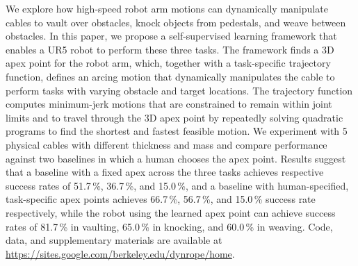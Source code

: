 We explore how high-speed robot arm motions can dynamically manipulate cables to vault over obstacles, knock objects from pedestals, and weave between obstacles. In this paper, we propose a self-supervised learning framework that enables a UR5 robot to perform these three tasks.
The framework finds a 3D apex point for the robot arm, which, together with a task-specific trajectory function, defines an arcing motion that dynamically manipulates the cable to perform tasks with varying obstacle and target locations. 
The trajectory function computes minimum-jerk motions that are constrained to remain within joint limits and to travel through the 3D apex point by repeatedly solving quadratic programs to find the shortest and fastest feasible motion.
We experiment with 5 physical cables with different thickness and mass and compare performance against two baselines in which a human chooses the apex point. Results suggest that a baseline with a fixed apex across the three tasks achieves respective success rates of 51.7\,\%, 36.7\,\%, and 15.0\,\%, and a baseline with human-specified, task-specific apex points achieves 66.7\,\%, 56.7\,\%, and 15.0\,\% success rate respectively, while the robot using the learned apex point can achieve success rates of 81.7\,\% in vaulting, 65.0\,\% in knocking, and 60.0\,\% in weaving.  Code, data, and supplementary materials are available at \url{https://sites.google.com/berkeley.edu/dynrope/home}.